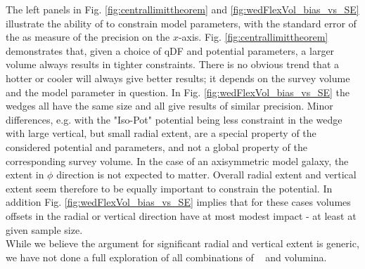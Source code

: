 The left panels in Fig. \ref{fig:centrallimittheorem} and \ref{fig:wedFlexVol_bias_vs_SE} illustrate the ability of \RM to constrain model parameters, with the standard error of the \pdf as measure of the precision on the $x$-axis. Fig. \ref{fig:centrallimittheorem} demonstrates that, given a choice of qDF and potential parameters, a larger volume always results in tighter constraints. There is no obvious trend that a hotter or cooler \MAP will always give better results; it depends on the survey volume and the model parameter in question. In Fig. \ref{fig:wedFlexVol_bias_vs_SE} the wedges all have the same size and all give results of similar precision. Minor differences, e.g. with the "Iso-Pot" potential being less constraint in the wedge with large vertical, but small radial extent, are a special property of the considered potential and parameters, and not a global property of the corresponding survey volume. In the case of an axisymmetric model galaxy, the extent in $\phi$ direction is not expected to matter. Overall radial extent and vertical extent seem therefore to be equally important to constrain the potential. In addition Fig. \ref{fig:wedFlexVol_bias_vs_SE} implies that for these cases volumes offsets in the radial or vertical direction have at most modest impact - at least at given sample size.
\\While we believe the argument for significant radial and vertical extent is generic, we have not done a full exploration of all combinations of \pmodel~ and volumina.





